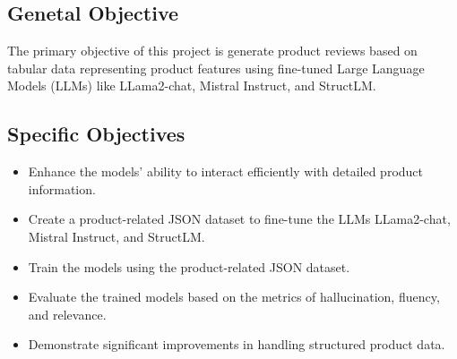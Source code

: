 \subsection{Genetal Objective}
The primary objective of this project is generate product reviews based on tabular data representing product features using fine-tuned Large Language Models (LLMs) like LLama2-chat, Mistral Instruct, and StructLM.
\subsection{Specific Objectives}
\begin{itemize}
    \item Enhance the models' ability to interact efficiently with detailed product information.
    \item Create a product-related JSON dataset to fine-tune the LLMs LLama2-chat, Mistral Instruct, and StructLM.
    \item Train the models using the product-related JSON dataset.
    \item Evaluate the trained models based on the metrics of hallucination, fluency, and relevance.
    \item Demonstrate significant improvements in handling structured product data.
\end{itemize}